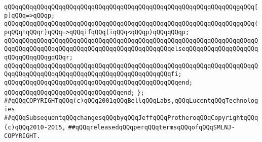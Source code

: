 \verb|qQQqqQQqqQQqqQQqqQQqqQQqqQQqqQQqqQQqqQQqqQQqqQQqqQQqqQQqqQQqqQQqgqQQq[p]qQQq=>qQQqp;|\newline
\verb|qQQqqQQqqQQqqQQqqQQqqQQqqQQqqQQqqQQqqQQqqQQqqQQqqQQqqQQqqQQqqQQqgqQQq(pqQQq!qQQqr)qQQq=>qQQqifqQQq(iqQQq<qQQqp)qQQqqQQqp;|\newline
\verb|qQQqqQQqqQQqqQQqqQQqqQQqqQQqqQQqqQQqqQQqqQQqqQQqqQQqqQQqqQQqqQQqqQQqqQQqqQQqqQQqqQQqqQQqqQQqqQQqqQQqqQQqqQQqqQQqqQQqelseqQQqqQQqqQQqqQQqqQQqqQQqqQQqqQQqgqQQqr;|\newline
\verb|qQQqqQQqqQQqqQQqqQQqqQQqqQQqqQQqqQQqqQQqqQQqqQQqqQQqqQQqqQQqqQQqqQQqqQQqqQQqqQQqqQQqqQQqqQQqqQQqqQQqqQQqqQQqqQQqqQQqfi;|\newline
\verb|qQQqqQQqqQQqqQQqqQQqqQQqqQQqqQQqqQQqqQQqqQQqqQQqend;|\newline
\verb|qQQqqQQqqQQqqQQqqQQqqQQqqQQqqQQqend;|\newline
\verb|};|\newline
\newline
\newline
\verb|##qQQqCOPYRIGHTqQQq(c)qQQq2001qQQqBellqQQqLabs,qQQqLucentqQQqTechnologies|\newline
\verb|##qQQqSubsequentqQQqchangesqQQqbyqQQqJeffqQQqProtheroqQQqCopyrightqQQq(c)qQQq2010-2015,|\newline
\verb|##qQQqreleasedqQQqperqQQqtermsqQQqofqQQqSMLNJ-COPYRIGHT.|\newline


